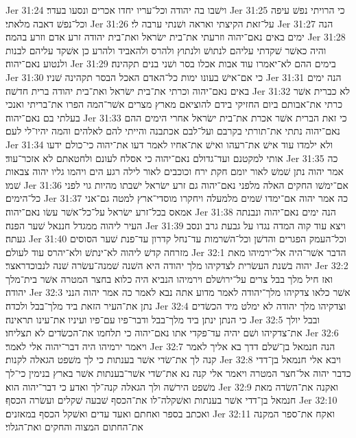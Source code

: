 Jer 31:24  וישׁבו בה יהודה וכל־עריו יחדו אכרים ונסעו בעדר׃
Jer 31:25  כי הרויתי נפשׁ עיפה וכל־נפשׁ דאבה מלאתי׃
Jer 31:26  על־זאת הקיצתי ואראה ושׁנתי ערבה לי׃
Jer 31:27  הנה ימים באים נאם־יהוה וזרעתי את־בית ישׂראל ואת־בית יהודה זרע אדם וזרע בהמה׃
Jer 31:28  והיה כאשׁר שׁקדתי עליהם לנתושׁ ולנתוץ ולהרס ולהאביד ולהרע כן אשׁקד עליהם לבנות ולנטוע נאם־יהוה׃
Jer 31:29  בימים ההם לא־יאמרו עוד אבות אכלו בסר ושׁני בנים תקהינה׃
Jer 31:30  כי אם־אישׁ בעונו ימות כל־האדם האכל הבסר תקהינה שׁניו׃
Jer 31:31  הנה ימים באים נאם־יהוה וכרתי את־בית ישׂראל ואת־בית יהודה ברית חדשׁה׃
Jer 31:32  לא כברית אשׁר כרתי את־אבותם ביום החזיקי בידם להוציאם מארץ מצרים אשׁר־המה הפרו את־בריתי ואנכי בעלתי בם נאם־יהוה׃
Jer 31:33  כי זאת הברית אשׁר אכרת את־בית ישׂראל אחרי הימים ההם נאם־יהוה נתתי את־תורתי בקרבם ועל־לבם אכתבנה והייתי להם לאלהים והמה יהיו־לי לעם׃
Jer 31:34  ולא ילמדו עוד אישׁ את־רעהו ואישׁ את־אחיו לאמר דעו את־יהוה כי־כולם ידעו אותי למקטנם ועד־גדולם נאם־יהוה כי אסלח לעונם ולחטאתם לא אזכר־עוד׃
Jer 31:35  כה אמר יהוה נתן שׁמשׁ לאור יומם חקת ירח וכוכבים לאור לילה רגע הים ויהמו גליו יהוה צבאות שׁמו׃
Jer 31:36  אם־ימשׁו החקים האלה מלפני נאם־יהוה גם זרע ישׂראל ישׁבתו מהיות גוי לפני כל־הימים׃
Jer 31:37  כה אמר יהוה אם־ימדו שׁמים מלמעלה ויחקרו מוסדי־ארץ למטה גם־אני אמאס בכל־זרע ישׂראל על־כל־אשׁר עשׂו נאם־יהוה׃
Jer 31:38  הנה ימים נאם־יהוה ונבנתה העיר ליהוה ממגדל חננאל שׁער הפנה׃
Jer 31:39  ויצא עוד קוה המדה נגדו על גבעת גרב ונסב געתה׃
Jer 31:40  וכל־העמק הפגרים והדשׁן וכל־השׁרמות עד־נחל קדרון עד־פנת שׁער הסוסים מזרחה קדשׁ ליהוה לא־ינתשׁ ולא־יהרס עוד לעולם׃
Jer 32:1  הדבר אשׁר־היה אל־ירמיהו מאת יהוה בשׁנת העשׂרית לצדקיהו מלך יהודה היא השׁנה שׁמנה־עשׂרה שׁנה לנבוכדראצר׃
Jer 32:2  ואז חיל מלך בבל צרים על־ירושׁלם וירמיהו הנביא היה כלוא בחצר המטרה אשׁר בית־מלך יהודה׃
Jer 32:3  אשׁר כלאו צדקיהו מלך־יהודה לאמר מדוע אתה נבא לאמר כה אמר יהוה הנני נתן את־העיר הזאת ביד מלך־בבל ולכדה׃
Jer 32:4  וצדקיהו מלך יהודה לא ימלט מיד הכשׂדים כי הנתן ינתן ביד מלך־בבל ודבר־פיו עם־פיו ועיניו את־עינו תראינה׃
Jer 32:5  ובבל יולך את־צדקיהו ושׁם יהיה עד־פקדי אתו נאם־יהוה כי תלחמו את־הכשׂדים לא תצליחו׃
Jer 32:6  ויאמר ירמיהו היה דבר־יהוה אלי לאמר׃
Jer 32:7  הנה חנמאל בן־שׁלם דדך בא אליך לאמר קנה לך את־שׂדי אשׁר בענתות כי לך משׁפט הגאלה לקנות׃
Jer 32:8  ויבא אלי חנמאל בן־דדי כדבר יהוה אל־חצר המטרה ויאמר אלי קנה נא את־שׂדי אשׁר־בענתות אשׁר בארץ בנימין כי־לך משׁפט הירשׁה ולך הגאלה קנה־לך ואדע כי דבר־יהוה הוא׃
Jer 32:9  ואקנה את־השׂדה מאת חנמאל בן־דדי אשׁר בענתות ואשׁקלה־לו את־הכסף שׁבעה שׁקלים ועשׂרה הכסף׃
Jer 32:10  ואכתב בספר ואחתם ואעד עדים ואשׁקל הכסף במאזנים׃
Jer 32:11  ואקח את־ספר המקנה את־החתום המצוה והחקים ואת־הגלוי׃
